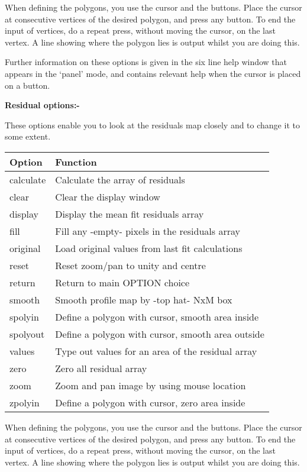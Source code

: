 \begin{small}
{{ When defining the polygons, you use the cursor and the
 buttons. Place the cursor at consecutive vertices of the
 desired polygon, and press any button. To end the input of
 vertices, do a repeat press, without moving the cursor, on
 the last vertex. A line showing where the polygon lies is
 output whilst you are doing this.

 Further information on these options is given in the six line help
 window that appears in the `panel' mode, and contains relevant help
 when the cursor is placed on a button.


 {\bf \hspace*{2em} Residual options:-}

 These options enable you to look at the residuals map
 closely and to change it to some extent.

 \begin{tabular}{|l|p{4.5in}|}\hline
 Option & Function \\ \hline
 calculate     &  Calculate the array of residuals \\
 clear         &  Clear the display window \\
 display       &  Display the mean fit residuals array \\
 fill          &  Fill any -empty- pixels in the residuals array \\
 original      &  Load original values from last fit calculations \\
 reset         &  Reset zoom/pan to unity and centre \\
 return        &  Return to main OPTION choice \\
 smooth        &  Smooth profile map by -top hat- NxM box \\
 spolyin       &  Define a polygon with cursor, smooth area inside \\
 spolyout      &  Define a polygon with cursor, smooth area outside \\
 values        &  Type out values for an area of the residual array \\
 zero          &  Zero all residual array \\
 zoom          &  Zoom and pan image by using mouse location \\
 zpolyin       &  Define a polygon with cursor, zero area inside \\
 \hline\end{tabular}

 When defining the polygons, you use the cursor and the
 buttons. Place the cursor at consecutive vertices of the
 desired polygon, and press any button. To end the input of
 vertices, do a repeat press, without moving the cursor, on
 the last vertex. A line showing where the polygon lies is
 output whilst you are doing this.

}}
\end{small}
